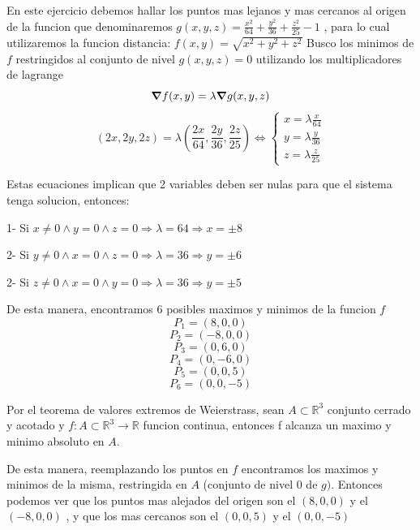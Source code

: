 \begin{solution}
    En este ejercicio debemos hallar los puntos mas lejanos y mas cercanos al origen de la funcion que denominaremos $g(x,y,z)=\frac{x^2}{64}+\frac{y^2}{36}+\frac{z^2}{25}-1$ , para lo cual utilizaremos la funcion distancia: $f(x,y)=\sqrt{x^2+y^2+z^2}$ \newline Busco los minimos de $f$ restringidos al conjunto de nivel $g(x,y,z)=0$ utilizando los multiplicadores de lagrange
\[
        \grad f(x,y)=\lambda \grad g(x,y,z)
    \]
    \[
        (2x,2y,2z)=\lambda (\frac{2x}{64},\frac{2y}{36},\frac{2z}{25}) \iff \begin{cases}
            x = \lambda\frac{x}{64}\\
            y = \lambda\frac{y}{36}\\
            z = \lambda\frac{z}{25}
        \end{cases}
    \]
    
    Estas ecuaciones implican que 2 variables deben ser nulas para que el sistema tenga solucion, entonces:

1- Si $x\neq 0 \land y=0 \land z=0 \Rightarrow \lambda=64  \Rightarrow x=\pm 8$ 

2- Si $y\neq 0 \land x=0 \land z=0 \Rightarrow \lambda=36  \Rightarrow y=\pm 6$ 

2- Si $z\neq 0 \land x=0 \land y=0 \Rightarrow \lambda=36  \Rightarrow y=\pm 5$ 

    De esta manera, encontramos 6 posibles maximos y minimos de la funcion $f$
\[
        P_1=(8,0,0) 
         \]
         \[
        P_2=(-8,0,0) 
         \]
        \[
        P_3=(0,6,0) 
         \]
         \[
        P_4=(0,-6,0) 
         \]
         \[
        P_5=(0,0,5) 
         \]
         \[
        P_6=(0,0,-5) 
    \]
    
    Por el teorema de valores extremos de Weierstrass, sean $A \subset \mathbb{R}^3$ conjunto cerrado y acotado y $f:A\subset\mathbb{R}^3\rightarrow\mathbb{R} $ funcion continua, entonces f alcanza un maximo y minimo absoluto en $A$.
    
    De esta manera, reemplazando los puntos en $f$ encontramos los maximos y minimos de la misma, restringida en $A$ (conjunto de nivel 0 de $g)$. Entonces podemos ver que los puntos mas alejados del origen son el $(8,0,0)$ y el $(-8,0,0)$ , y que los mas cercanos son el $(0,0,5)$  y el $(0,0,-5)$ \newline
    

\end{solution}
